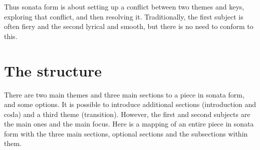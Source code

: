 \documentclass[a4paper]{article}
\begin{document}
Thus sonata form is about setting up a conflict between two
themes and keys, exploring that conflict, and then resolving it.
Traditionally, the first subject is often fiery and the second
lyrical and smooth, but there is no need to conform to this.

\clearpage

\section{The structure}

There are two main themes and three main sections to a
piece in sonata form, and some options.  It is possible to introduce
additional sections (introduction and coda) and a third theme
(transition).  However, the first and second subjects are the
main ones and the main focus.
Here is a mapping of an entire piece in sonata form
with the three main sections, optional sections
and the subsections within them.
\end{document}
